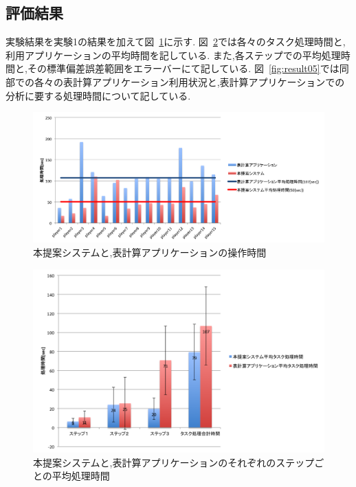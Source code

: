 \documentclass[sotsuron]{kuee}
\begin{document}
		\subsection{評価結果}
			実験結果を実験1の結果を加えて図~\ref{fig:result03}に示す. 
			図~\ref{fig:result04}では各々のタスク処理時間と,利用アプリケーションの平均時間を記している. 
			また,各ステップでの平均処理時間と,その標準偏差誤差範囲をエラーバーにて記している. 
			図~\ref{fig:result05}では同部での各々の表計算アプリケーション利用状況と,表計算アプリケーションでの分析に要する処理時間について記している. 
			\begin{figure}
				\begin{center}
					\includegraphics[width=\linewidth]{./png/result03.png}
				\end{center}
				\caption{本提案システムと,表計算アプリケーションの操作時間}
		  		\label{fig:result03}
			\end{figure}
			\begin{figure}
				\begin{center}
					\includegraphics[width=\linewidth]{./png/result04.png}
				\end{center}
				\caption{本提案システムと,表計算アプリケーションのそれぞれのステップごとの平均処理時間}
		  		\label{fig:result04}
			\end{figure}
\end{document}

